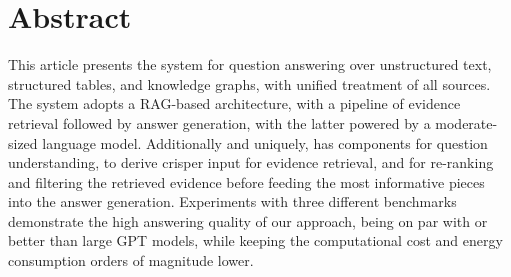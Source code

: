 \section*{Abstract}
This article presents the \method system for question answering over unstructured text, structured tables, and knowledge graphs, with unified treatment of all sources.
The system adopts a RAG-based architecture, with a pipeline of evidence retrieval followed by answer generation, with the latter powered by a 
moderate-sized
language model.
Additionally and uniquely, \method
has components for question understanding, to derive crisper input for evidence retrieval, and for re-ranking and filtering the retrieved evidence before feeding the most informative pieces into the answer generation.
Experiments with three different benchmarks demonstrate the high answering quality of our approach, being on par with or better than large GPT models, while keeping the computational cost and energy consumption orders of magnitude lower.
